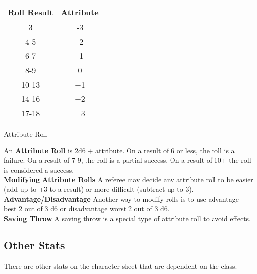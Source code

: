 \begin{multicols}{2}
\begin{table}[H]

\begin{center}
\Large
{}
\begin{tabular}{ c  c  }


\textbf{
Roll Result} &\textbf{ Attribute}\\
\bottomrule
\bottomrule

3 & -3 \\

4-5 & -2 \\

6-7 & -1 \\

8-9 & 0 \\

10-13 & +1 \\

14-16 & +2 \\

17-18 & +3 \\

\end{tabular}
\end{center}
\label{table:RollingAttributes}
\vspace{-1cm}
\end{table}
\vspace{1cm}
\begin{mercHeading}
Attribute Roll
\end{mercHeading}

An \textbf{Attribute Roll} is 2d6 + attribute. On a result of 6 or less, the roll is a failure. On a result of 7-9, the roll is a partial success. On a result of 10+ the roll is considered a success.\\
\textbf{Modifying Attribute Rolls} A referee may decide any attribute roll to be easier (add up to +3 to a result) or more difficult (subtract up to 3). \\
\textbf{Advantage/Disadvantage} Another way to modify rolls is to use advantage best 2 out of 3 d6 or disadvantage worst 2 out of 3 d6.\\
\textbf{Saving Throw} A saving throw is a special type of attribute roll to avoid effects.
\subsection*{Other Stats}
There are other stats on the character sheet that are dependent on the class.




\end{multicols}
